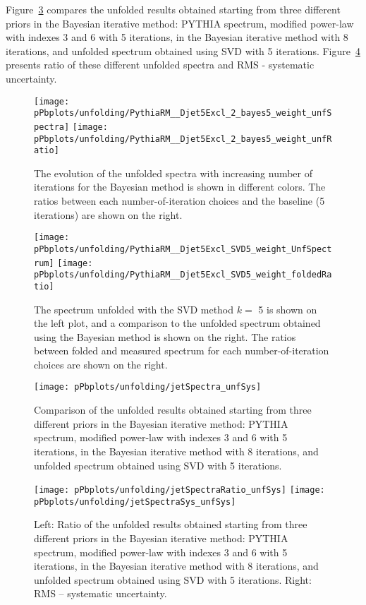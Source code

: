 Figure~\ref{fig:unfcomparison} compares the unfolded results obtained starting from three different priors in the Bayesian iterative method: PYTHIA spectrum, modified power-law with indexes $3$ and $6$ with 5 iterations, in the Bayesian iterative method with 8 iterations, and unfolded spectrum obtained using SVD with 5 iterations. Figure~\ref{fig:unfcomparisonSys} presents ratio of these different unfolded spectra and RMS - systematic uncertainty.

\begin{figure}[bth]
\centering
\texttt{[image: pPbplots/unfolding/PythiaRM\_\_Djet5Excl\_2\_bayes5\_weight\_unfSpectra]}
\texttt{[image: pPbplots/unfolding/PythiaRM\_\_Djet5Excl\_2\_bayes5\_weight\_unfRatio]}
\caption{The evolution of the unfolded spectra with increasing number of iterations for the Bayesian method is shown in different colors.
The ratios between each number-of-iteration choices and the baseline (5 iterations) are shown on the right.}
\label{fig:unfBayesReg_pPb}
\end{figure}

\begin{figure}[bth]
\centering
\texttt{[image: pPbplots/unfolding/PythiaRM\_\_Djet5Excl\_SVD5\_weight\_UnfSpectrum]}
\texttt{[image: pPbplots/unfolding/PythiaRM\_\_Djet5Excl\_SVD5\_weight\_foldedRatio]}
\caption{The spectrum unfolded with the SVD method $k=$ 5 is shown on the left plot, and a comparison to the unfolded spectrum obtained using the Bayesian method is shown on the right.
The ratios between folded and measured spectrum for each number-of-iteration choices are shown on the right.}
\label{fig:unfSVDReg_pPb}
\end{figure}


\begin{figure}[bth]
\centering
\texttt{[image: pPbplots/unfolding/jetSpectra\_unfSys]}
\caption{Comparison of the unfolded results obtained starting from three different priors in the Bayesian iterative method: PYTHIA spectrum, modified power-law with indexes $3$ and $6$ with 5 iterations, in the Bayesian iterative method with 8 iterations, and unfolded spectrum obtained using SVD with 5 iterations.}
\label{fig:unfcomparison}
\end{figure}

\begin{figure}[bth]
\centering
\texttt{[image: pPbplots/unfolding/jetSpectraRatio\_unfSys]}
\texttt{[image: pPbplots/unfolding/jetSpectraSys\_unfSys]}
\caption{Left: Ratio of the unfolded results obtained starting from three different priors in the Bayesian iterative method: PYTHIA spectrum, modified power-law with indexes $3$ and $6$ with 5 iterations, in the Bayesian iterative method with 8 iterations, and unfolded spectrum obtained using SVD with 5 iterations. Right: RMS -- systematic uncertainty. }
\label{fig:unfcomparisonSys}
\end{figure}


